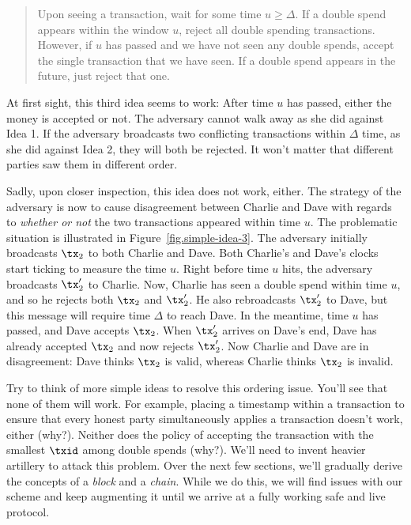 \begin{quote}
Upon seeing a transaction, wait for some time $u \geq \Delta$. If a double spend
appears within the window $u$, reject all double spending transactions. However, if $u$ has passed and we have
not seen any double spends, accept the single transaction that we have seen. If a double spend appears in
the future, just reject that one.
\end{quote}

At first sight, this third idea seems to work: After time $u$ has passed, either the money is accepted or not.
The adversary cannot walk away as she did against Idea 1. If the adversary broadcasts two conflicting
transactions within $\Delta$ time, as she did against Idea 2, they will both be rejected. It won't matter
that different parties saw them in different order.

Sadly, upon closer inspection, this idea does not work,
either. The strategy of the adversary is now to cause disagreement between Charlie and Dave with
regards to \emph{whether or not} the two transactions appeared within time $u$. The problematic situation
is illustrated in Figure~\ref{fig.simple-idea-3}. The adversary initially broadcasts $\tx_2$
to both Charlie and Dave. Both Charlie's and Dave's clocks start ticking to measure the time $u$.
Right before time $u$ hits, the adversary broadcasts $\tx_2'$ to Charlie. Now, Charlie has seen
a double spend within time $u$, and so he rejects both $\tx_2$ and $\tx_2'$. He also rebroadcasts
$\tx_2'$ to Dave, but this message will require time $\Delta$ to reach Dave. In the meantime,
time $u$ has passed, and Dave accepts $\tx_2$. When $\tx_2'$ arrives on Dave's end, Dave has
already accepted $\tx_2$ and now rejects $\tx_2'$. Now Charlie and Dave are in disagreement:
Dave thinks $\tx_2$ is valid, whereas Charlie thinks $\tx_2$ is invalid.

Try to think of more simple ideas to resolve this ordering issue. You'll see that
none of them will work. For example, placing a timestamp within a transaction to ensure
that every honest party simultaneously applies a transaction doesn't work, either (why?).
Neither does the policy of accepting the transaction with the smallest $\txid$ among
double spends (why?).
We'll need to invent heavier artillery to attack this problem. Over the next few
sections, we'll gradually derive the concepts of a \emph{block} and a \emph{chain}.
While we do this, we will find issues with our scheme and keep augmenting it until
we arrive at a fully working safe and live protocol.

